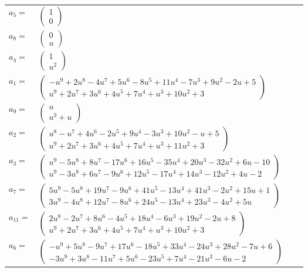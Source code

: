 \documentclass[1p]{elsarticle_modified}
\theoremstyle{definition}
\begin{document}
\begin{tabular}{m{7pt} m{180pt} m{7pt} m{180pt} }
\flushright $a_{5}=$&$\begin{pmatrix}1\\0\end{pmatrix}$ \\
\flushright $a_{8}=$&$\begin{pmatrix}0\\u\end{pmatrix}$ \\
\flushright $a_{4}=$&$\begin{pmatrix}1\\u^2\end{pmatrix}$ \\
\flushright $a_{1}=$&$\begin{pmatrix}- u^9+2 u^8-4 u^7+5 u^6-8 u^5+11 u^4-7 u^3+9 u^2-2 u+5\\u^9+2 u^7+3 u^6+4 u^5+7 u^4+u^3+10 u^2+3\end{pmatrix}$ \\
\flushright $a_{9}=$&$\begin{pmatrix}u\\u^3+u\end{pmatrix}$ \\
\flushright $a_{2}=$&$\begin{pmatrix}u^8- u^7+4 u^6-2 u^5+9 u^4-3 u^3+10 u^2- u+5\\u^9+2 u^7+3 u^6+4 u^5+7 u^4+u^3+11 u^2+3\end{pmatrix}$ \\
\flushright $a_{3}=$&$\begin{pmatrix}u^9-5 u^8+8 u^7-17 u^6+16 u^5-35 u^4+20 u^3-32 u^2+6 u-10\\u^9-3 u^8+6 u^7-9 u^6+12 u^5-17 u^4+14 u^3-12 u^2+4 u-2\end{pmatrix}$ \\
\flushright $a_{7}=$&$\begin{pmatrix}5 u^9-5 u^8+19 u^7-9 u^6+41 u^5-13 u^4+41 u^3-2 u^2+15 u+1\\3 u^9-4 u^8+12 u^7-8 u^6+24 u^5-13 u^4+23 u^3-4 u^2+5 u\end{pmatrix}$ \\
\flushright $a_{11}=$&$\begin{pmatrix}2 u^8-2 u^7+8 u^6-4 u^5+18 u^4-6 u^3+19 u^2-2 u+8\\u^9+2 u^7+3 u^6+4 u^5+7 u^4+u^3+10 u^2+3\end{pmatrix}$ \\
\flushright $a_{6}=$&$\begin{pmatrix}- u^9+5 u^8-9 u^7+17 u^6-18 u^5+33 u^4-24 u^3+28 u^2-7 u+6\\-3 u^9+3 u^8-11 u^7+5 u^6-23 u^5+7 u^4-21 u^3-6 u-2\end{pmatrix}$ \\

\end{tabular}
\end{document}
